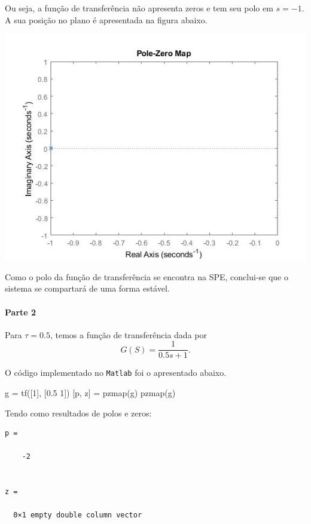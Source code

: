 \documentclass[
]{book}
\newenvironment{Shaded}{\begin{snugshade}}{\end{snugshade}}
\newcommand{\FloatTok}[1]{\textcolor[rgb]{0.00,0.00,0.81}{#1}}
\newcommand{\NormalTok}[1]{#1}
\begin{document}
Ou seja, a função de transferência não apresenta zeros e tem seu polo em \(s = -1\). A sua posição no plano é apresentada na figura abaixo.

\includegraphics{Imagens/Lab2/tau1.jpg}

Como o polo da função de transferência se encontra na SPE, conclui-se que o sistema se compartará de uma forma estável.

\hypertarget{parte-2}{%
\paragraph{Parte 2}\label{parte-2}}

Para \(\tau = 0.5\), temos a função de transferência dada por
\[
G(S)= \frac {1}{0.5s+1}.
\]

O código implementado no \texttt{Matlab} foi o apresentado abaixo.

\begin{Shaded}
\begin{Highlighting}[]
\NormalTok{g = tf([}\FloatTok{1}\NormalTok{], [}\FloatTok{0.5} \FloatTok{1}\NormalTok{])}
\NormalTok{[p, z] = pzmap(g)}
\NormalTok{pzmap(g)}
\end{Highlighting}
\end{Shaded}

Tendo como resultados de polos e zeros:

\begin{verbatim}
p =

    -2


z =

  0×1 empty double column vector
\end{verbatim}
\end{document}
